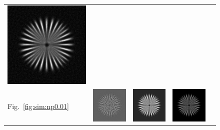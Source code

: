 \documentclass{./packages/optica-article}
\begin{document}
\begin{figure}[hbp]
\begin{tabular}[t]{l c c c c}
		\includegraphics[scale=0.25]{Simulation deconvolution/ref_ng_0.01/RL_50.png}
		\\
		Fig.~\ref{fig:sim:np0.01}                                                       &
		\includegraphics[scale=0.25]{Simulation deconvolution/ref_np_0.01/RIF_0.01.png} &
		\includegraphics[scale=0.25]{Simulation deconvolution/ref_np_0.01/RIF_1.png}    &
		\includegraphics[scale=0.25]{Simulation deconvolution/ref_np_0.01/RL_10.png}    &

\end{tabular}
\end{figure}
\end{document}
